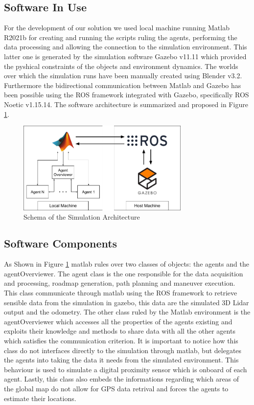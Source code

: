 \documentclass[twocolumn, a4paper]{article}
\begin{document}
\subsection{Software In Use}
For the development of our solution we used local machine running Matlab R2021b
for creating and running
the scripts ruling the agents, performing the data processing and allowing the 
connection to the simulation environment. This latter one is 
generated by the simulation software Gazebo v11.11 which provided the
pyshical constraints of the objects and environment dynamics. The worlds over
which the simulation runs have been manually created using Blender v3.2.
Furthermore the bidirectional communication between Matlab and Gazebo has
been possible using the ROS framework integrated with Gazebo, specifically
ROS Noetic v1.15.14.
The software architecture is summarized and proposed in Figure \ref{fig:S_Arch}.
\vspace{0.5cm}
\begin{figure}[h]
    \centering
    \includegraphics[width=8.5cm]{"../Report_images/Simulation_Architecture.png"}
    \caption{Schema of the Simulation Architecture}
    \label{fig:S_Arch}
\end{figure}
\subsection{Software Components}
As Shown in Figure \ref{fig:S_Arch} matlab rules over two classes of objects:
the agents and the agentOverviewer. The agent class is the one responsible 
for the data acquisition and processing, roadmap generation, path planning and
maneuver execution. This class communicate through matlab using the ROS
framework to retrieve sensible data from the simulation in gazebo, this data
are the simulated 3D Lidar output and the odometry.
The other class ruled by the Matlab environment is the agentOverviewer which
accesses all the properties of the agents existing and exploits their
knowledge and methods to share data with all the other agents which 
satisfies the communication criterion. It is important to notice how this
class do not interfaces directly to the simulation through matlab, but
delegates the agents into taking the data it needs from the simulated
environment. This behaviour is used to simulate a digital proximity sensor
which is onboard of each agent. Lastly, this class also embeds the informations
regarding which areas of the global map do not allow for GPS data retrival
and forces the agents to estimate their locations.
\end{document}
